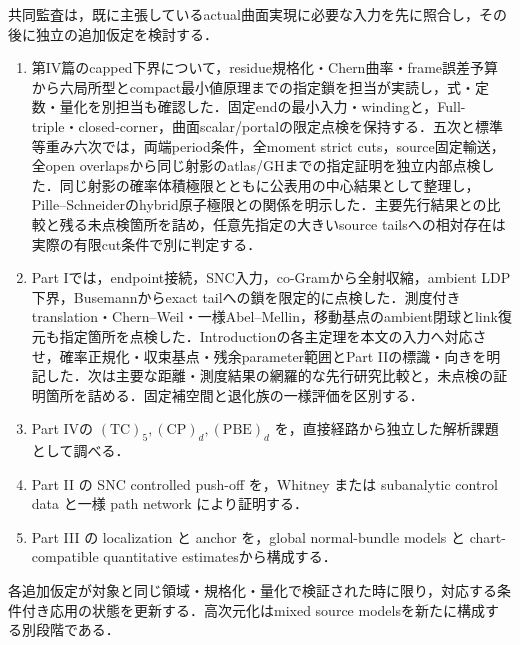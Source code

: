\documentclass[a4paper,11pt]{ltjsarticle}
\numberwithin{equation}{section}
\theoremstyle{plain}
\theoremstyle{definition}
\theoremstyle{remark}
\begin{document}
共同監査は，既に主張しているactual曲面実現に必要な入力を先に照合し，その後に独立の追加仮定を検討する．
\begin{enumerate}
\item 第IV篇のcapped下界について，residue規格化・Chern曲率・frame誤差予算から六局所型とcompact最小値原理までの指定鎖を担当が実読し，式・定数・量化を別担当も確認した．固定endの最小入力・windingと，Full-triple・closed-corner，曲面scalar/portalの限定点検を保持する．五次と標準等重み六次では，両端period条件，全moment strict cuts，source固定輸送，全open overlapsから同じ射影のatlas/GHまでの指定証明を独立内部点検した．同じ射影の確率体積極限とともに公表用の中心結果として整理し，Pille--Schneiderのhybrid原子極限との関係を明示した．主要先行結果との比較と残る未点検箇所を詰め，任意先指定の大きいsource tailsへの相対存在は実際の有限cut条件で別に判定する．
\item Part Iでは，endpoint接続，SNC入力，co-Gramから全射収縮，ambient LDP下界，Busemannからexact tailへの鎖を限定的に点検した．測度付きtranslation・Chern--Weil・一様Abel--Mellin，移動基点のambient閉球とlink復元も指定箇所を点検した．Introductionの各主定理を本文の入力へ対応させ，確率正規化・収束基点・残余parameter範囲とPart IIの標識・向きを明記した．次は主要な距離・測度結果の網羅的な先行研究比較と，未点検の証明箇所を詰める．固定補空間と退化族の一様評価を区別する．
\item Part IVの \(\mathrm{(TC)}_5,\mathrm{(CP)}_d,\mathrm{(PBE)}_d\) を，直接経路から独立した解析課題として調べる．
\item Part II の SNC controlled push-off を，Whitney または subanalytic control data と一様 path network により証明する．
\item Part III の localization と anchor を，global normal-bundle models と chart-compatible quantitative estimatesから構成する．
\end{enumerate}
各追加仮定が対象と同じ領域・規格化・量化で検証された時に限り，対応する条件付き応用の状態を更新する．高次元化はmixed source modelsを新たに構成する別段階である．
\end{document}
